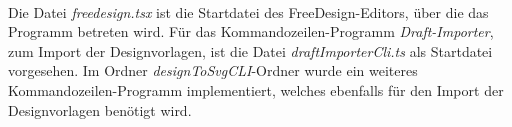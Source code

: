 \paragraph{}Die Datei \emph{freedesign.tsx} ist die Startdatei des FreeDesign-Editors, über die das Programm betreten wird. Für das Kommandozeilen-Programm \emph{Draft-Importer}, zum Import der Designvorlagen, ist die Datei \emph{draftImporterCli.ts} als Startdatei vorgesehen. Im Ordner \emph{designToSvgCLI}-Ordner wurde ein weiteres Kommandozeilen-Programm implementiert, welches ebenfalls für den Import der Designvorlagen benötigt wird.







